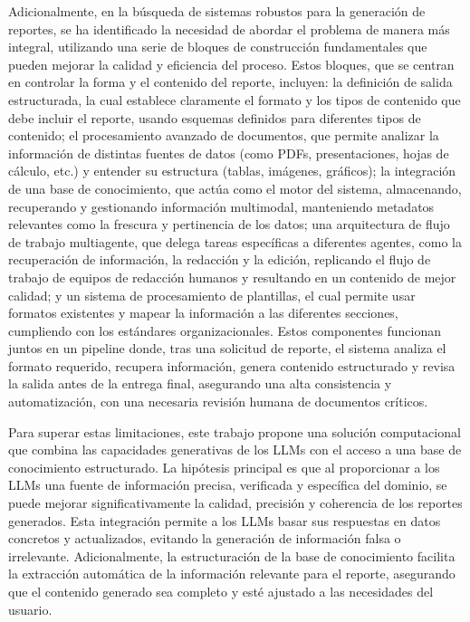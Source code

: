 Adicionalmente, en la búsqueda de sistemas robustos para la generación de reportes, se ha identificado la necesidad de abordar el problema de manera más integral, utilizando una serie de bloques de construcción fundamentales que pueden mejorar la calidad y eficiencia del proceso. Estos bloques, que se centran en controlar la forma y el contenido del reporte, incluyen: la definición de salida estructurada, la cual establece claramente el formato y los tipos de contenido que debe incluir el reporte, usando esquemas definidos para diferentes tipos de contenido; el procesamiento avanzado de documentos, que permite analizar la información de distintas fuentes de datos (como PDFs, presentaciones, hojas de cálculo, etc.) y entender su estructura (tablas, imágenes, gráficos); la integración de una base de conocimiento, que actúa como el motor del sistema, almacenando, recuperando y gestionando información multimodal, manteniendo metadatos relevantes como la frescura y pertinencia de los datos; una arquitectura de flujo de trabajo multiagente, que delega tareas específicas a diferentes agentes, como la recuperación de información, la redacción y la edición, replicando el flujo de trabajo de equipos de redacción humanos y resultando en un contenido de mejor calidad; y un sistema de procesamiento de plantillas, el cual permite usar formatos existentes y mapear la información a las diferentes secciones, cumpliendo con los estándares organizacionales. Estos componentes funcionan juntos en un pipeline donde, tras una solicitud de reporte, el sistema analiza el formato requerido, recupera información, genera contenido estructurado y revisa la salida antes de la entrega final, asegurando una alta consistencia y automatización, con una necesaria revisión humana de documentos críticos.

Para superar estas limitaciones, este trabajo propone una solución computacional que combina las capacidades generativas de los LLMs con el acceso a una base de conocimiento estructurado. La hipótesis principal es que al proporcionar a los LLMs una fuente de información precisa, verificada y específica del dominio, se puede mejorar significativamente la calidad, precisión y coherencia de los reportes generados. Esta integración permite a los LLMs basar sus respuestas en datos concretos y actualizados, evitando la generación de información falsa o irrelevante.  Adicionalmente, la estructuración de la base de conocimiento facilita la extracción automática de la información relevante para el reporte, asegurando que el contenido generado sea completo y esté ajustado a las necesidades del usuario.

